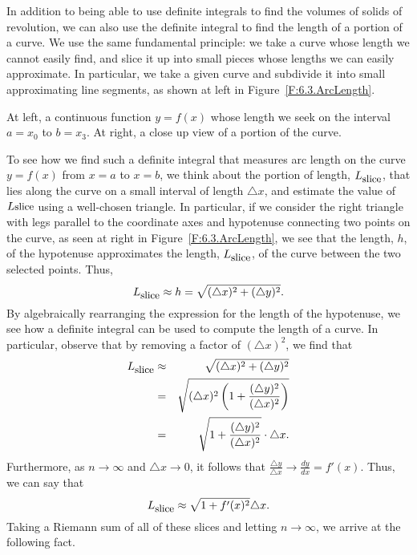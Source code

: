In addition to being able to use definite integrals to find the volumes of solids of revolution, we can also use the definite integral to find the length of a portion of a curve.  We use the same fundamental principle:  we take a curve whose length we cannot easily find, and slice it up into small pieces whose lengths we can easily approximate.  In particular, we take a given curve and subdivide it into small approximating line segments, as shown at left in Figure~\ref{F:6.3.ArcLength}.
  
\begin{marginfigure}[2cm] %
\caption{At left, a continuous function $y = f(x)$ whose length we seek on the interval $a = x_0$ to $b = x_3$.  At right, a close up view of a portion of the curve.} \label{F:6.3.ArcLength}
\end{marginfigure}

To see how we find such a definite integral that measures arc length on the curve $y = f(x)$ from $x = a$ to $x = b$, we think about the portion of length, $L_{\mbox{\small{slice}}}$, that lies along the curve on a small interval of length $\triangle x$, and estimate the value of $L{\mbox{\small{slice}}}$ using a well-chosen triangle.  In particular, if we consider the right triangle with legs parallel to the coordinate axes and hypotenuse connecting two points on the curve, as seen at right in Figure~\ref{F:6.3.ArcLength}, we see that the length, $h$, of the hypotenuse approximates the length, $L_{\mbox{\small{slice}}}$, of the curve between the two selected points.  Thus,
$$L_{\mbox{\small{slice}}} \approx h = \sqrt{ (\triangle x)^2 + (\triangle y)^2 }.$$
By algebraically rearranging the expression for the length of the hypotenuse, we see how a definite integral can be used to compute the length of a curve.  In particular, observe that by removing a factor of $(\triangle x)^2$, we find that
\begin{eqnarray*}
L_{\mbox{\small{slice}}} & \approx & \sqrt{ (\triangle x)^2 + (\triangle y)^2 } \\
& = & \sqrt{ (\triangle x)^2\left(1 + \frac{(\triangle y)^2}{(\triangle x)^2} \right)} \\
& = & \sqrt{1 + \frac{(\triangle y)^2}{(\triangle x)^2} } \cdot \triangle x.
\end{eqnarray*}
Furthermore, as $n \to \infty$ and $\triangle x \to 0$, it follows that $\frac{\triangle y}{\triangle x} \to \frac{dy}{dx} = f'(x)$.  Thus, we can say that
$$L_{\mbox{\small{slice}}} \approx \sqrt{1 + f'(x)^2} \triangle x.$$
Taking a Riemann sum of all of these slices and letting $n \to \infty$, we arrive at the following fact.

